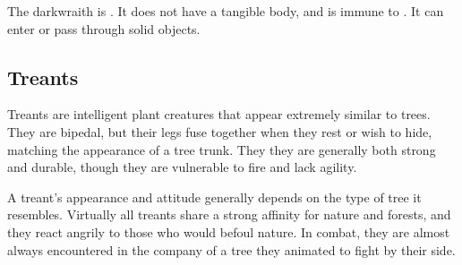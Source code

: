       
      The darkwraith is .
      It does not have a tangible body, and is immune to .
      It can enter or pass through solid objects.
  
    \subsection{Treants}
      
      Treants are intelligent plant creatures that appear extremely similar to trees.
      They are bipedal, but their legs fuse together when they rest or wish to hide, matching the appearance of a tree trunk.
      They they are generally both strong and durable, though they are vulnerable to fire and lack agility.
    
      A treant's appearance and attitude generally depends on the type of tree it resembles.
      Virtually all treants share a strong affinity for nature and forests, and they react angrily to those who would befoul nature.
      In combat, they are almost always encountered in the company of a tree they animated to fight by their side.
    

